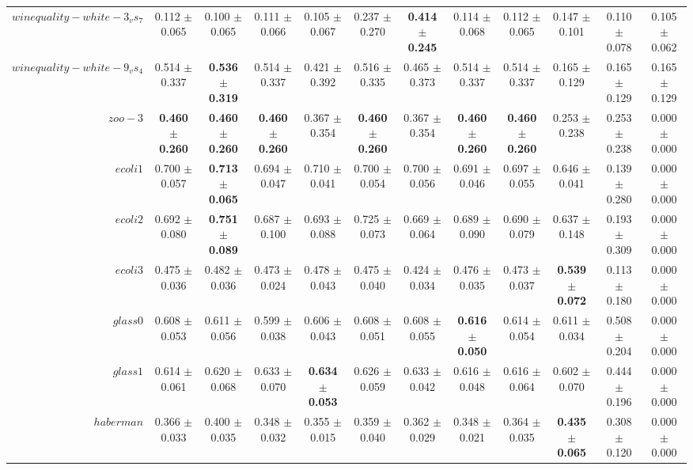 \begin{table}[!ht]
{\begin{tabular}{r c c c c c c c c c c c}
$winequality-white-3_vs_7$ & 0.112 $\pm$ 0.065 & 0.100 $\pm$ 0.065 & 0.111 $\pm$ 0.066 & 0.105 $\pm$ 0.067 & 0.237 $\pm$ 0.270 & \textbf{0.414 $\pm$ 0.245} & 0.114 $\pm$ 0.068 & 0.112 $\pm$ 0.065 & 0.147 $\pm$ 0.101 & 0.110 $\pm$ 0.078 & 0.105 $\pm$ 0.062 \\
$winequality-white-9_vs_4$ & 0.514 $\pm$ 0.337 & \textbf{0.536 $\pm$ 0.319} & 0.514 $\pm$ 0.337 & 0.421 $\pm$ 0.392 & 0.516 $\pm$ 0.335 & 0.465 $\pm$ 0.373 & 0.514 $\pm$ 0.337 & 0.514 $\pm$ 0.337 & 0.165 $\pm$ 0.129 & 0.165 $\pm$ 0.129 & 0.165 $\pm$ 0.129 \\
$zoo-3$ & \textbf{0.460 $\pm$ 0.260} & \textbf{0.460 $\pm$ 0.260} & \textbf{0.460 $\pm$ 0.260} & 0.367 $\pm$ 0.354 & \textbf{0.460 $\pm$ 0.260} & 0.367 $\pm$ 0.354 & \textbf{0.460 $\pm$ 0.260} & \textbf{0.460 $\pm$ 0.260} & 0.253 $\pm$ 0.238 & 0.253 $\pm$ 0.238 & 0.000 $\pm$ 0.000 \\
$ecoli1$ & 0.700 $\pm$ 0.057 & \textbf{0.713 $\pm$ 0.065} & 0.694 $\pm$ 0.047 & 0.710 $\pm$ 0.041 & 0.700 $\pm$ 0.054 & 0.700 $\pm$ 0.056 & 0.691 $\pm$ 0.046 & 0.697 $\pm$ 0.055 & 0.646 $\pm$ 0.041 & 0.139 $\pm$ 0.280 & 0.000 $\pm$ 0.000 \\
$ecoli2$ & 0.692 $\pm$ 0.080 & \textbf{0.751 $\pm$ 0.089} & 0.687 $\pm$ 0.100 & 0.693 $\pm$ 0.088 & 0.725 $\pm$ 0.073 & 0.669 $\pm$ 0.064 & 0.689 $\pm$ 0.090 & 0.690 $\pm$ 0.079 & 0.637 $\pm$ 0.148 & 0.193 $\pm$ 0.309 & 0.000 $\pm$ 0.000 \\
$ecoli3$ & 0.475 $\pm$ 0.036 & 0.482 $\pm$ 0.036 & 0.473 $\pm$ 0.024 & 0.478 $\pm$ 0.043 & 0.475 $\pm$ 0.040 & 0.424 $\pm$ 0.034 & 0.476 $\pm$ 0.035 & 0.473 $\pm$ 0.037 & \textbf{0.539 $\pm$ 0.072} & 0.113 $\pm$ 0.180 & 0.000 $\pm$ 0.000 \\
$glass0$ & 0.608 $\pm$ 0.053 & 0.611 $\pm$ 0.056 & 0.599 $\pm$ 0.038 & 0.606 $\pm$ 0.043 & 0.608 $\pm$ 0.051 & 0.608 $\pm$ 0.055 & \textbf{0.616 $\pm$ 0.050} & 0.614 $\pm$ 0.054 & 0.611 $\pm$ 0.034 & 0.508 $\pm$ 0.204 & 0.000 $\pm$ 0.000 \\
$glass1$ & 0.614 $\pm$ 0.061 & 0.620 $\pm$ 0.068 & 0.633 $\pm$ 0.070 & \textbf{0.634 $\pm$ 0.053} & 0.626 $\pm$ 0.059 & 0.633 $\pm$ 0.042 & 0.616 $\pm$ 0.048 & 0.616 $\pm$ 0.064 & 0.602 $\pm$ 0.070 & 0.444 $\pm$ 0.196 & 0.000 $\pm$ 0.000 \\
$haberman$ & 0.366 $\pm$ 0.033 & 0.400 $\pm$ 0.035 & 0.348 $\pm$ 0.032 & 0.355 $\pm$ 0.015 & 0.359 $\pm$ 0.040 & 0.362 $\pm$ 0.029 & 0.348 $\pm$ 0.021 & 0.364 $\pm$ 0.035 & \textbf{0.435 $\pm$ 0.065} & 0.308 $\pm$ 0.120 & 0.000 $\pm$ 0.000 \\

\end{tabular}}
\end{table}
